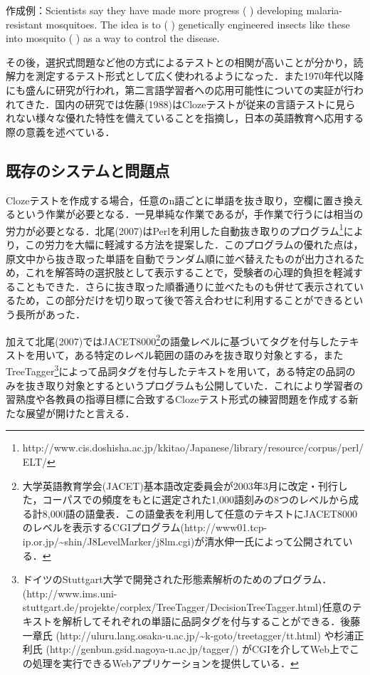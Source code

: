 \documentclass[japanese]{jnlp_1.4}
\begin{document}
作成例：Scientists say they have made more progress (     ) developing malaria-resistant mosquitoes. The idea is to (      ) genetically engineered insects like these into mosquito (      ) as a way to control the disease.

その後，選択式問題など他の方式によるテストとの相関が高いことが分かり，読解力を測定するテスト形式として広く使われるようになった．また1970年代以降にも盛んに研究が行われ，第二言語学習者への応用可能性についての実証が行われてきた．国内の研究では佐藤(1988)はClozeテストが従来の言語テストに見られない様々な優れた特性を備えていることを指摘し，日本の英語教育へ応用する際の意義を述べている．


\subsection{既存のシステムと問題点}

Clozeテストを作成する場合，任意のn語ごとに単語を抜き取り，空欄に置き換えるという作業が必要となる．一見単純な作業であるが，手作業で行うには相当の労力が必要となる．北尾(2007)はPerlを利用した自動抜き取りのプログラム\footnote{http://www.cis.doshisha.ac.jp/kkitao/Japanese/library/resource/corpus/perl/ELT/}により，この労力を大幅に軽減する方法を提案した．このプログラムの優れた点は，原文中から抜き取った単語を自動でランダム順に並べ替えたものが出力されるため，これを解答時の選択肢として表示することで，受験者の心理的負担を軽減することもできた．さらに抜き取った順番通りに並べたものも併せて表示されているため，この部分だけを切り取って後で答え合わせに利用することができるという長所があった．

加えて北尾(2007)ではJACET8000\footnote{大学英語教育学会(JACET)基本語改定委員会が2003年3月に改定・刊行した，コーパスでの頻度をもとに選定された1,000語刻みの8つのレベルから成る計8,000語の語彙表．この語彙表を利用して任意のテキストにJACET8000のレベルを表示するCGIプログラム(http://www01.tcp-ip.or.jp/\textasciitilde shin/J8LevelMarker/j8lm.cgi)が清水伸一氏によって公開されている．}の語彙レベルに基づいてタグを付与したテキストを用いて，ある特定のレベル範囲の語のみを抜き取り対象とする，またTreeTagger\footnote{ドイツのStuttgart大学で開発された形態素解析のためのプログラム．(http://www.ims.uni-stuttgart.de/projekte/corplex/TreeTagger/DecisionTreeTagger.html)任意のテキストを解析してそれぞれの単語に品詞タグを付与することができる．後藤一章氏 (http://uluru.lang.osaka-u.ac.jp/\textasciitilde k-goto/treetagger/tt.html) や杉浦正利氏 (http://genbun.gsid.nagoya-u.ac.jp/tagger/) がCGIを介してWeb上でこの処理を実行できるWebアプリケーションを提供している．}によって品詞タグを付与したテキストを用いて，ある特定の品詞のみを抜き取り対象とするというプログラムも公開していた．これにより学習者の習熟度や各教員の指導目標に合致するClozeテスト形式の練習問題を作成する新たな展望が開けたと言える．
\end{document}

